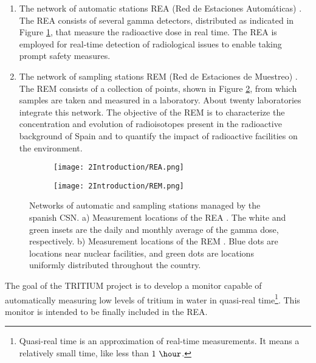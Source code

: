 \begin{enumerate}
\begin{enumerate}
\item{} The network of automatic stations REA (Red de Estaciones Automáticas) \cite{REA}. The REA consists of several gamma detectors, distributed as indicated in Figure \ref{subfig:REA}, that measure the radioactive dose in real time. The REA is employed for real-time detection of radiological issues to enable taking prompt safety measures.

\item{} The network of sampling stations REM (Red de Estaciones de Muestreo) \cite{REM}. The REM consists of a collection of points, shown in Figure \ref{subfig:REM}, from which samples are taken and measured in a laboratory. About twenty laboratories integrate this network. The objective of the REM is to characterize the concentration and evolution of radioisotopes present in the radioactive background of Spain and to quantify the impact of radioactive facilities on the environment.
\end{enumerate}

\begin{figure}
\centering
    \begin{subfigure}[b]{0.7\textwidth}
    \centering
    \texttt{[image: 2Introduction/REA.png]}  
        \caption{}\label{subfig:REA}
    \end{subfigure}
    \hfill
    \begin{subfigure}[b]{0.7\textwidth}
    \centering
    \texttt{[image: 2Introduction/REM.png]}  
    \caption{\label{subfig:REM}}
    \end{subfigure}
 \caption{Networks of automatic and sampling stations managed by the spanish CSN. a) Measurement locations of the REA \cite{REA}. The white and green insets are the daily and monthly average of the gamma dose, respectively. b) Measurement locations of the REM \cite{REM}. Blue dots are locations near nuclear facilities, and green dots are locations uniformly distributed throughout the country.}
 \label{fig:NetworksCSN}
\end{figure}

\end{enumerate}

The goal of the TRITIUM project is to develop a monitor capable of automatically measuring low levels of tritium in water in quasi-real time\footnote{Quasi-real time is an approximation of real-time measurements. It means a relatively small time, like less than $1~\hour$.}. This monitor is intended to be finally included in the REA.

